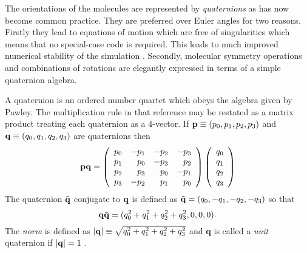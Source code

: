 \label{sec:quaternions}
The orientations of the molecules are represented by {\em quaternions}
as  has now  become common  practice.   They are  preferred over Euler
angles for two reasons. Firstly they lead to equations of motion which
are  free  of singularities   \cite{evans:77} which   means  that   no
special-case  code is required. This  leads to much improved numerical
stability      of  the  simulation  \cite{evans:77b}.   Secondly,
molecular symmetry   operations   and  combinations of  rotations  are
elegantly expressed   in    terms  of     a     simple      quaternion
algebra\cite{evans:77b,pawley:85b}.

A quaternion  is an ordered number  quartet  which obeys  the  algebra
given  by   Pawley\cite{pawley:81}.  The multiplication   rule in that
reference may be restated as a matrix product treating each quaternion
as a  4-vector.  If  ${\bf p} \equiv (p_0,p_1,p_2,p_3)$ and  ${\bf q}
\equiv  (q_0,q_1,q_2,q_3)$  are quaternions then
\begin{equation}
{\bf pq} = 
\left(
\begin{array}{rrrr}
p_0 & -p_1 & -p_2 & -p_3 \\
p_1 &  p_0 & -p_3 &  p_2 \\
p_2 &  p_3 &  p_0 & -p_1 \\
p_3 & -p_2 &  p_1 &  p_0 
\end{array}
\right) \left(
\begin{array}{r}
q_0 \\ q_1 \\ q_2 \\ q_3
\end{array}
\right)
\end{equation}
The quaternion $ {\bf \tilde{q}} $ conjugate to ${\bf q}$ is defined
as ${\bf \tilde{q}} = (q_0,-q_1,-q_2,-q_3)$ so that
\begin{equation}
{\bf q\tilde{q}} = (q_0^2+q_1^2+q_2^2+q_3^2,0,0,0) .
\label{eqn:qnorm}
\end{equation}
The {\em norm} is defined as $ |{\bf q}| \equiv
\sqrt{q_0^2+q_1^2+q_2^2+q_3^2} $ and {\bf q} is called a {\em unit}
quaternion if $ |{\bf q}| = 1 $ .  


